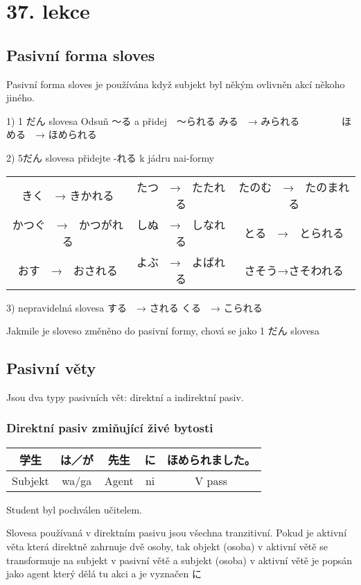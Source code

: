 
\section{37. lekce}
\label{sec:lekce_37}

\subsection{Pasivní forma sloves}
Pasivní forma sloves je používána když subjekt byl někým ovlivněn akcí někoho jiného. 

1) 1 だん slovesa
Odsuň 〜る a přidej　〜られる
みる　→ みられる　　　　
ほめる　→  ほめられる

2) 5だん slovesa
přidejte -れる k jádru nai-formy

\begin{center}
\begin{tabular}{ccc}
きく　→ きかれる&たつ　→　たたれる&たのむ　→　たのまれる\\
かつぐ　→　かつがれる&しぬ　→　しなれる&とる　→　とられる\\
おす　→　おされる&よぶ　→　よばれる&さそう→さそわれる\\
\end{tabular}
\end{center}

3) nepravidelná slovesa
する　→ される
くる　→  こられる

Jakmile je sloveso změněno do pasivní formy, chová se jako 1 だん slovesa



\subsection{Pasivní věty}
Jsou dva typy pasivních vět: direktní a indirektní pasiv.

\subsubsection{Direktní pasiv zmiňující živé bytosti }
\begin{center}
\begin{tabular}{||c|c||c|c||c||}
\hline
学生&は／が&先生&に&ほめられました。\\
\hline
Subjekt&wa/ga&Agent&ni&V pass\\
\hline
\end{tabular}
\end{center}
Student byl pochválen učitelem.

Slovesa používaná v direktním pasivu jsou všechna tranzitivní. Pokud je aktivní věta která 
direktně zahrnuje dvě osoby, tak objekt (osoba) v aktivní větě se transformuje na subjekt v pasivní větě a subjekt (osoba) v aktivní větě je popsán jako agent který dělá tu akci a je vyznačen に

